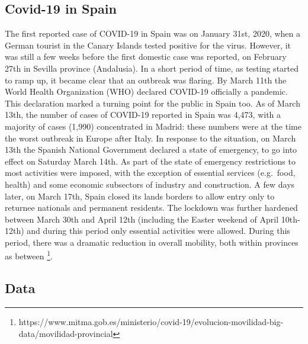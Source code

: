 \documentclass[]{elsarticle} %
\begin{document}
\hypertarget{covid-19-in-spain}{%
\subsection{Covid-19 in Spain}\label{covid-19-in-spain}}

The first reported case of COVID-19 in Spain was on January 31st, 2020,
when a German tourist in the Canary Islands tested positive for the
virus. However, it was still a few weeks before the first domestic case
was reported, on February 27th in Sevilla province (Andalusia). In a
short period of time, as testing started to ramp up, it became clear
that an outbreak was flaring. By March 11th the World Health
Organization (WHO) declared COVID-19 officially a pandemic. This
declaration marked a turning point for the public in Spain too. As of
March 13th, the number of cases of COVID-19 reported in Spain was 4,473,
with a majority of cases (1,990) concentrated in Madrid: these numbers
were at the time the worst outbreak in Europe after Italy. In response
to the situation, on March 13th the Spanish National Government declared
a state of emergency, to go into effect on Saturday March 14th. As part
of the state of emergency restrictions to most activities were imposed,
with the exception of essential services (e.g.~food, health) and some
economic subsectors of industry and construction. A few days later, on
March 17th, Spain closed its lands borders to allow entry only to
returnee nationals and permanent residents. The lockdown was further
hardened between March 30th and April 12th (including the Easter weekend
of April 10th-12th) and during this period only essential activities
were allowed. During this period, there was a dramatic reduction in
overall mobility, both within provinces as between
\footnote{https://www.mitma.gob.es/ministerio/covid-19/evolucion-movilidad-big-data/movilidad-provincial}.

\hypertarget{data}{%
\subsection{Data}\label{data}}
\end{document}
